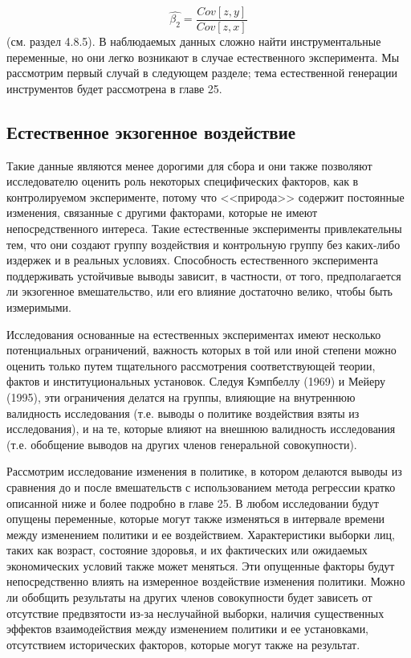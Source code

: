 \begin{equation}
\hat{\beta_{2}}=\frac{Cov[z,y]}{Cov[z,x]}
\end{equation}
(см. раздел 4.8.5). В наблюдаемых данных сложно найти инструментальные переменные, но они легко возникают в случае естественного эксперимента. Мы рассмотрим первый случай в следующем разделе; тема естественной генерации инструментов будет рассмотрена в главе 25.

\subsection{Естественное экзогенное воздействие}


Такие данные являются менее дорогими для сбора и они также позволяют исследователю оценить роль некоторых специфических факторов, как в контролируемом эксперименте, потому что <<природа>> содержит постоянные изменения, связанные с другими факторами, которые не имеют непосредственного интереса. Такие естественные эксперименты привлекательны тем, что они создают группу воздействия и контрольную группу без каких-либо издержек и в реальных условиях. Способность естественного эксперимента поддерживать устойчивые выводы зависит, в частности, от того, предполагается ли экзогенное вмешательство, или его влияние достаточно велико, чтобы быть измеримыми.


Исследования основанные на естественных экспериментах имеют несколько потенциальных ограничений, важность которых в той или иной степени можно оценить только путем тщательного рассмотрения соответствующей теории, фактов и институциональных установок. Следуя Кэмпбеллу (1969) и Мейеру (1995), эти ограничения делатся на группы, влияющие на внутреннюю валидность исследования (т.е. выводы о политике воздействия взяты из исследования), и  на те, которые влияют на внешнюю валидность исследования (т.е. обобщение выводов на других членов генеральной совокупности).


Рассмотрим исследование изменения в политике, в котором делаются выводы из сравнения до и после вмешательств с использованием метода регрессии кратко описанной ниже и более подробно в главе 25. В любом исследовании будут опущены переменные, которые могут также изменяться в интервале времени между изменением политики и ее воздействием. Характеристики выборки лиц, таких как возраст, состояние здоровья, и их фактических или ожидаемых экономических условий также может меняться. Эти опущенные факторы будут непосредственно влиять на измеренное воздействие изменения политики. Можно ли обобщить  результаты на других членов совокупности будет зависеть от отсутствие предвзятости из-за неслучайной выборки, наличия существенных эффектов взаимодействия между изменением политики и ее установками, отсутствием исторических факторов, которые могут также на результат.


